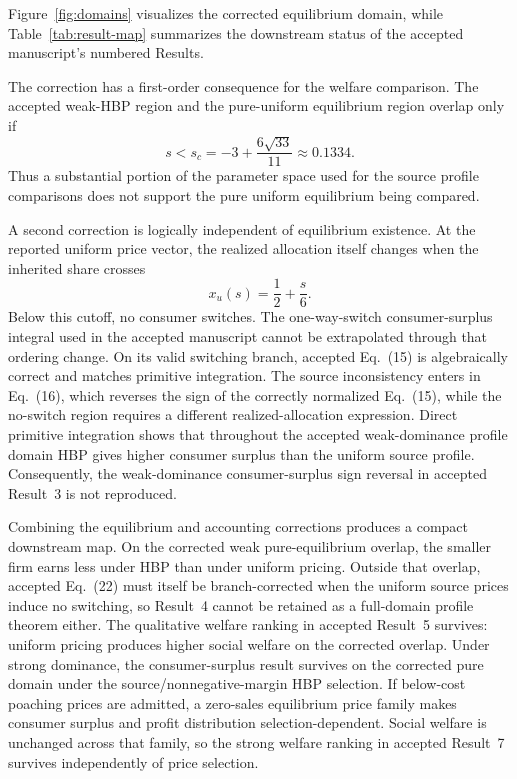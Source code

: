 Figure~\ref{fig:domains} visualizes the corrected equilibrium domain, while Table~\ref{tab:result-map} summarizes the downstream status of the accepted manuscript's numbered Results.

The correction has a first-order consequence for the welfare comparison. The accepted weak-HBP region and the pure-uniform equilibrium region overlap only if
\[
s<s_c
=
-3+\frac{6\sqrt{33}}{11}
\approx0.1334.
\]
Thus a substantial portion of the parameter space used for the source profile comparisons does not support the pure uniform equilibrium being compared.

A second correction is logically independent of equilibrium existence. At the reported uniform price vector, the realized allocation itself changes when the inherited share crosses
\[
x_u(s)=\frac12+\frac{s}{6}.
\]
Below this cutoff, no consumer switches. The one-way-switch consumer-surplus integral used in the accepted manuscript cannot be extrapolated through that ordering change. On its valid switching branch, accepted Eq.~(15) is algebraically correct and matches primitive integration. The source inconsistency enters in Eq.~(16), which reverses the sign of the correctly normalized Eq.~(15), while the no-switch region requires a different realized-allocation expression. Direct primitive integration shows that throughout the accepted weak-dominance profile domain HBP gives higher consumer surplus than the uniform source profile. Consequently, the weak-dominance consumer-surplus sign reversal in accepted Result~3 is not reproduced.

Combining the equilibrium and accounting corrections produces a compact downstream map. On the corrected weak pure-equilibrium overlap, the smaller firm earns less under HBP than under uniform pricing. Outside that overlap, accepted Eq.~(22) must itself be branch-corrected when the uniform source prices induce no switching, so Result~4 cannot be retained as a full-domain profile theorem either. The qualitative welfare ranking in accepted Result~5 survives: uniform pricing produces higher social welfare on the corrected overlap. Under strong dominance, the consumer-surplus result survives on the corrected pure domain under the source/nonnegative-margin HBP selection. If below-cost poaching prices are admitted, a zero-sales equilibrium price family makes consumer surplus and profit distribution selection-dependent. Social welfare is unchanged across that family, so the strong welfare ranking in accepted Result~7 survives independently of price selection.

